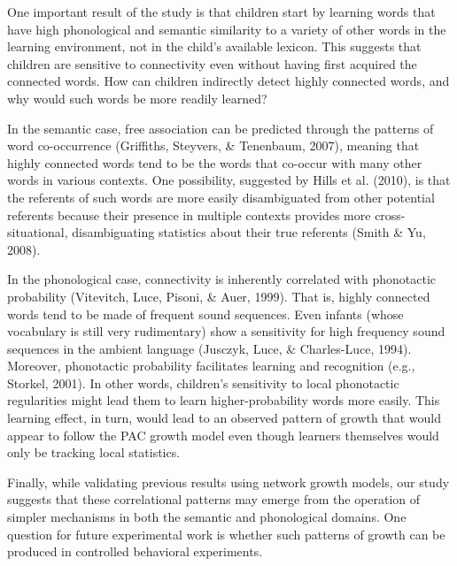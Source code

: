 \documentclass[10pt, letterpaper]{article}
\begin{document}
One important result of the study is that children start by learning
words that have high phonological and semantic similarity to a variety
of other words in the learning environment, not in the child's available
lexicon. This suggests that children are sensitive to connectivity even
without having first acquired the connected words. How can children
indirectly detect highly connected words, and why would such words be
more readily learned?

In the semantic case, free association can be predicted through the
patterns of word co-occurrence (Griffiths, Steyvers, \& Tenenbaum,
2007), meaning that highly connected words tend to be the words that
co-occur with many other words in various contexts. One possibility,
suggested by Hills et al. (2010), is that the referents of such words
are more easily disambiguated from other potential referents because
their presence in multiple contexts provides more cross-situational,
disambiguating statistics about their true referents (Smith \& Yu,
2008).

In the phonological case, connectivity is inherently correlated with
phonotactic probability (Vitevitch, Luce, Pisoni, \& Auer, 1999). That
is, highly connected words tend to be made of frequent sound sequences.
Even infants (whose vocabulary is still very rudimentary) show a
sensitivity for high frequency sound sequences in the ambient language
(Jusczyk, Luce, \& Charles-Luce, 1994). Moreover, phonotactic
probability facilitates learning and recognition (e.g., Storkel, 2001).
In other words, children's sensitivity to local phonotactic regularities
might lead them to learn higher-probability words more easily. This
learning effect, in turn, would lead to an observed pattern of growth
that would appear to follow the PAC growth model even though learners
themselves would only be tracking local statistics.

Finally, while validating previous results using network growth models,
our study suggests that these correlational patterns may emerge from the
operation of simpler mechanisms in both the semantic and phonological
domains. One question for future experimental work is whether such
patterns of growth can be produced in controlled behavioral experiments.

\vspace{1em}

\vspace{1em}
\end{document}
